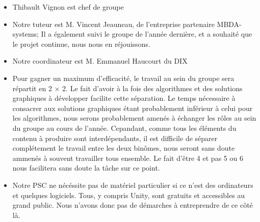 \documentclass[12pt, openany]{article}
\begin{document}
\begin{itemize}
    \setlength\itemsep{0.7cm}
    \item Thibault Vignon est chef de groupe
    \item Notre tuteur est M. Vincent Jeauneau, de l'entreprise partenaire MBDA-systems; Il a également suivi le groupe de l'année dernière, et a souhaité que le projet continue, nous nous en réjouissons. 
    \item Notre coordinateur est M. Emmanuel Haucourt du DIX
    \item Pour gagner un maximum d'efficacité, le travail au sein du groupe sera répartit en 2 $\times$ 2. Le fait d'avoir à la fois des algorithmes et des solutions graphiques à développer facilite cette séparation. Le temps nécessaire à consacrer aux solutions graphiques étant probablement inférieur à celui pour les algorithmes, nous serons probablement amenés à échanger les rôles au sein du groupe au cours de l'année. Cepandant, comme tous les éléments du contenu à produire sont interdépendants, il est difficile de séparer complétement le travail entre les deux binômes, nous seront sans doute ammenés à souvent travailler tous ensemble. Le fait d'être 4 et pas 5 ou 6 nous facilitera sans doute la tâche sur ce point.
    \item Notre PSC ne nécéssite pas de matériel particulier si ce n'est des ordinateurs et quelques logiciels. Tous, y compris Unity, sont gratuits et accessibles au grand public. Nous n'avons donc pas de démarches à entreprendre de ce côté là.
    
\end{itemize}
\end{document}
